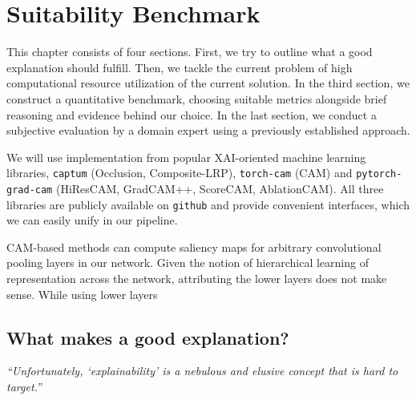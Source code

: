 \chapter{Suitability Benchmark}\label{experiment}

This chapter consists of four sections. First, we try to outline what a good explanation should fulfill. Then, we tackle the current problem of high computational resource utilization of the current solution. In the third section, we construct a quantitative benchmark, choosing suitable metrics alongside brief reasoning and evidence behind our choice. In the last section, we conduct a subjective evaluation by a domain expert using a previously established approach.

We will use implementation from popular XAI-oriented machine learning libraries, \texttt{captum} (Occlusion, Composite-LRP), \texttt{torch-cam} (CAM) and \texttt{pytorch-grad-cam} (HiResCAM, GradCAM++, ScoreCAM, AblationCAM). All three libraries are publicly available on \texttt{github} and provide convenient interfaces, which we can easily unify in our pipeline.

CAM-based methods can compute saliency maps for arbitrary convolutional pooling layers in our network.
Given the notion of hierarchical learning of representation across the network, attributing the lower layers does not make sense.
While using lower layers 

\section{What makes a good explanation?}

\emph{``Unfortunately, `explainability' is a nebulous and elusive concept that is hard to target.''} \cite{explainability-hard}
\newline

